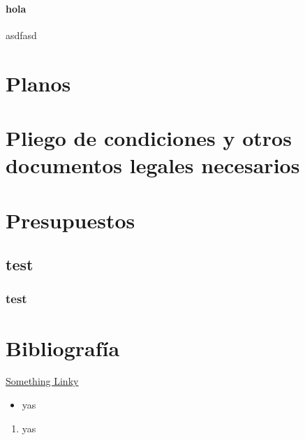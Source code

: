 \documentclass[a4paper ,12pt, onecolumn]{article}
\begin{document}
\paragraph{hola}
asdfasd

\section{Planos}
\section{Pliego de condiciones y otros documentos legales necesarios}
\section{Presupuestos}
\subsection{test}
\subsubsection{test}


\section{Bibliografía}
\href{https://campus.masterd.es/campusvirtual/index.htm}{Something Linky} 
\begin{itemize}
    \item  yas
\end{itemize}
\begin{enumerate}
    \item  yas
\end{enumerate}
\end{document}
